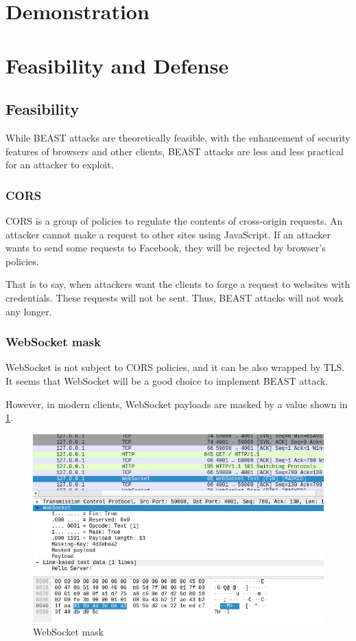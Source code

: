 \documentclass{acm_proc_article-sp}
\begin{document}
\section{}

\section{Demonstration}
\section{Feasibility and Defense}
\subsection{Feasibility}
While BEAST attacks are theoretically feasible, with the enhancement of security
features of browsers and other clients, BEAST attacks are less and less practical
for an attacker to exploit.

\subsubsection{CORS}
CORS is a group of policies to regulate the contents of cross-origin requests.
An attacker cannot make a request to other sites using JavaScript. If an attacker
wants to send some requests to Facebook, they will be rejected by browser's policies.

That is to say, when attackers want the clients to forge a request to websites with
credentials. These requests will not be sent. Thus, BEAST attacks will not work
any longer.

\subsubsection{WebSocket mask}
WebSocket is not subject to CORS policies, and it can be also wrapped by TLS.
It seems that WebSocket will be a good choice to implement BEAST attack.

However, in modern clients, WebSocket payloads are masked by a value shown in \ref{fig:websocket-mask}.

\begin{figure}[htb]
    \centering
    \includegraphics[keepaspectratio, width=\linewidth]{./figures/websocket-mask.png}
    \caption{WebSocket mask}
    \label{fig:websocket-mask}
\end{figure}
\end{document}
